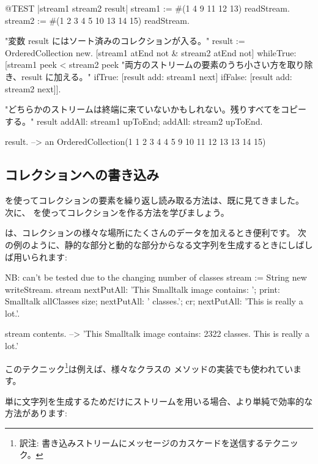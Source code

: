 \documentclass[a4paper,10pt,twoside]{book}
\begin{document}
\begin{code}{@TEST |stream1 stream2 result|}
stream1 := #(1 4 9 11 12 13) readStream.
stream2 := #(1 2 3 4 5 10 13 14 15) readStream.

"変数 result にはソート済みのコレクションが入る。"
result := OrderedCollection new.
[stream1 atEnd not & stream2 atEnd not]
  whileTrue: [stream1 peek < stream2 peek
    "両方のストリームの要素のうち小さい方を取り除き、result に加える。"
    ifTrue: [result add: stream1 next]
    ifFalse: [result add: stream2 next]].

"どちらかのストリームは終端に来ていないかもしれない。残りすべてをコピーする。"
result
  addAll: stream1 upToEnd;
  addAll: stream2 upToEnd.

result. -->   an OrderedCollection(1 1 2 3 4 4 5 9 10 11 12 13 13 14 15)
\end{code}

\subsection{コレクションへの書き込み}

 を使ってコレクションの要素を繰り返し読み取る方法は、既に見てきました。
次に、 を使ってコレクションを作る方法を学びましょう。

 は、コレクションの様々な場所にたくさんのデータを加えるとき便利です。
次の例のように、静的な部分と動的な部分からなる文字列を生成するときにしばしば用いられます:

\begin{code}{NB: can't be tested due to the changing number of classes}
stream := String new writeStream.
stream
  nextPutAll: 'This Smalltalk image contains: ';
  print: Smalltalk allClasses size;
  nextPutAll: ' classes.';
  cr;
  nextPutAll: 'This is really a lot.'.

stream contents. --> 'This Smalltalk image contains: 2322 classes.
This is really a lot.'
\end{code}

このテクニック\footnote{訳注: 書き込みストリームにメッセージのカスケードを送信するテクニック。}は例えば、様々なクラスの  メソッドの実装でも使われています。

単に文字列を生成するためだけにストリームを用いる場合、より単純で効率的な方法があります: %

\end{document}
